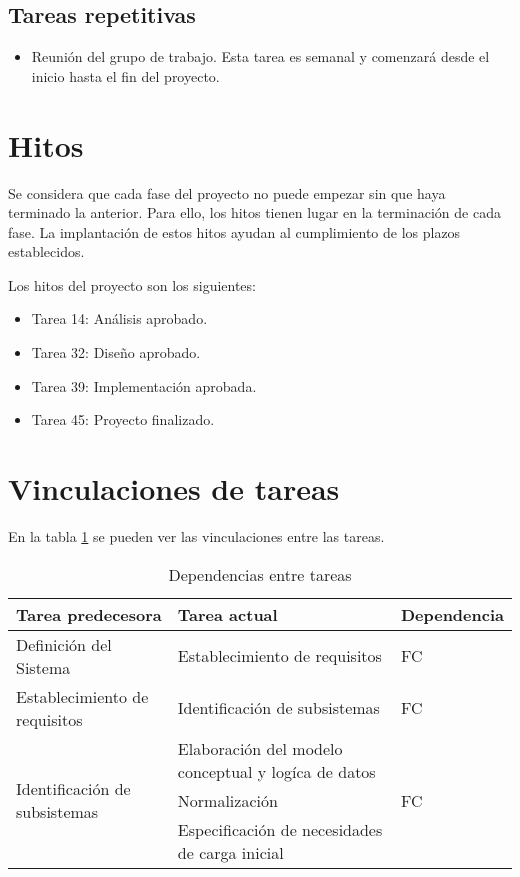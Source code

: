 \documentclass[11pt,a4paper,spanish,twoside]{book}
\begin{document}
\subsection{Tareas repetitivas}
  \begin{itemize}
  \item Reunión del grupo de trabajo. Esta tarea es semanal y comenzará desde
    el inicio hasta el fin del proyecto.
  \end{itemize}

\section{Hitos}
Se considera que cada fase del proyecto no puede empezar sin que haya
terminado la anterior. Para ello, los hitos tienen lugar en la terminación de
cada fase. La implantación de estos hitos ayudan al cumplimiento de los
plazos establecidos.

Los hitos del proyecto son los siguientes:
\begin{itemize}
\item Tarea 14: Análisis aprobado.
\item Tarea 32: Diseño aprobado.
\item Tarea 39: Implementación aprobada.
\item Tarea 45: Proyecto finalizado.
\end{itemize}

\section{Vinculaciones de tareas}
En la tabla \ref{Tab:Dep} se pueden ver las vinculaciones entre las tareas.
\begin{table}[!h]
  \centering
  \small
  \begin{tabular}{l|p{5cm}|l}
    \textbf{Tarea predecesora} & \textbf{Tarea actual} & \textbf{Dependencia}\\
    \hline
    Definición del Sistema & Establecimiento de requisitos & FC \\
    \hline
    Establecimiento de requisitos & Identificación de subsistemas & FC \\
    \hline
    \multirow{3}{*}{Identificación de subsistemas} & Elaboración del modelo
    conceptual y logíca de datos & \multirow{3}{*}{FC} \\
    & Normalización \\
    & Especificación de necesidades de carga inicial \\
  \end{tabular}
  \caption{Dependencias entre tareas} \label{Tab:Dep}
\end{table}
\end{document}

